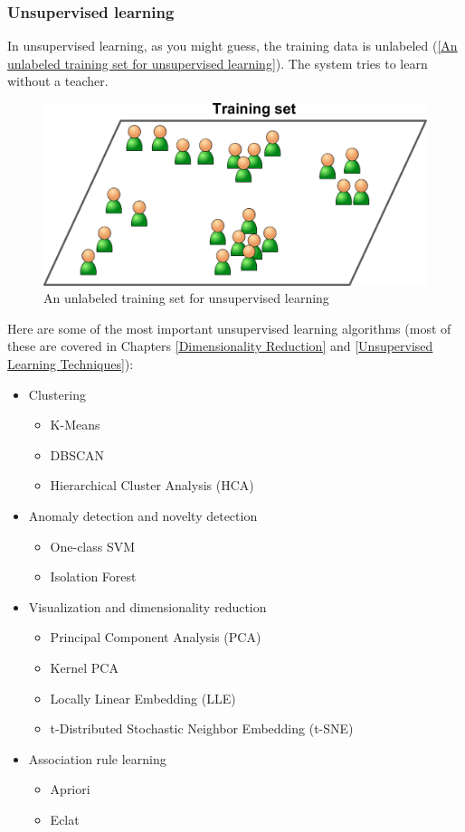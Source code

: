 \subsubsection{Unsupervised learning}
In unsupervised learning, as you might guess, the training data is unlabeled
(\autoref{An unlabeled training set for unsupervised learning}). The system tries to learn without a teacher.
\begin{figure}
\centering
\includegraphics{img/An unlabeled training set for unsupervised learning.png}
\caption{An unlabeled training set for unsupervised learning}
\label{An unlabeled training set for unsupervised learning}
\end{figure}
Here are some of the most important unsupervised learning algorithms (most of
these are covered in Chapters \ref{Dimensionality Reduction} and \ref{Unsupervised Learning Techniques}):
\begin{itemize}
\item Clustering
\begin{itemize}
\item K-Means
\item DBSCAN
\item Hierarchical Cluster Analysis (HCA)
\end{itemize}
\item Anomaly detection and novelty detection
\begin{itemize}
\item One-class SVM
\item Isolation Forest
\end{itemize}

\item Visualization and dimensionality reduction
\begin{itemize}
\item Principal Component Analysis (PCA)
\item Kernel PCA
\item Locally Linear Embedding (LLE)
\item t-Distributed Stochastic Neighbor Embedding (t-SNE)
\end{itemize}
\item
 Association rule learning
\begin{itemize}
\item Apriori
\item Eclat
\end{itemize}
\end{itemize}


